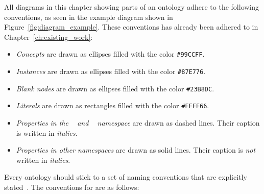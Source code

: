 All diagrams in this chapter showing parts of an ontology adhere to the following conventions, as seen in the example diagram shown in Figure~\ref{fig:diagram_example}. These conventions has already been adhered to in Chapter~\ref{ch:existing_work}:
\begin{itemize}
  \item \emph{Concepts} are drawn as ellipses filled with the color \texttt{\textcolor{convention_color1}{\#99CCFF}}.
  \item \emph{Instances} are drawn as ellipses filled with the color \texttt{\textcolor{convention_color2}{\#87E776}}.
  \item \emph{Blank nodes} are drawn as ellipses filled with the color \texttt{\textcolor{convention_color3}{\#23B8DC}}.
  \item \emph{Literals} are drawn as rectangles filled with the color \texttt{\colorbox{convention_color_bg4}{\textcolor{convention_color4}{\#FFFF66}}}.
  \item \emph{Properties in the ~\cite{RDF} and ~\cite{RDFS} namespace} are drawn as dashed lines. Their caption is written in \emph{italics}.
  \item \emph{Properties in other namespaces} are drawn as solid lines. Their caption is \emph{not} written in \emph{italics}.
\end{itemize}

Every ontology should stick to a set of naming conventions that are explicitly stated~\cite{Ontology101}. The conventions for \smarthomeweather are as follows:

